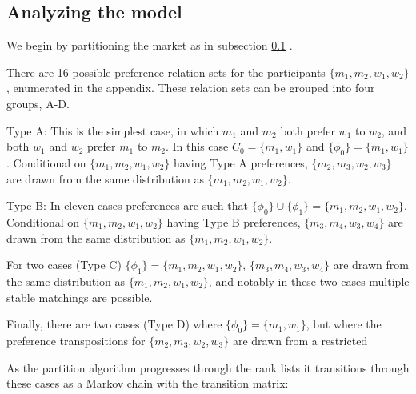 \documentclass[WP]{AEA}
\begin{document}
\subsection{Analyzing the model} \label{subsect:partition}

We begin by partitioning the market as in subsection \ref{subsect:partition} . 

There are 16 possible preference relation sets for the participants $\{m_1,m_2,w_1,w_2\}$, enumerated in the appendix. These relation sets can be grouped into four groups, A-D.

Type A: This is the simplest case, in which $m_1$ and $m_2$ both prefer $w_1$ to $w_2$, and both $w_1$ and $w_2$ prefer $m_1$ to $m_2$.  In this case $C_0 =\{m_1,w_1\}$ and $\{\phi_0\}=\{m_1,w_1\}$. 
Conditional on $\{m_1,m_2,w_1,w_2\}$ having Type A preferences, $\{m_2,m_3,w_2,w_3\}$ are drawn from the same distribution as $\{m_1,m_2,w_1,w_2\}$.  

Type B: In eleven cases preferences are such that $ \{\phi_0\} \cup \{\phi_1\}=\{m_1,m_2,w_1,w_2\} $.
Conditional on $\{m_1,m_2,w_1,w_2\}$ having Type B preferences, $\{m_3,m_4,w_3,w_4\}$ are drawn from the same distribution as $\{m_1,m_2,w_1,w_2\}$.  

 For two cases (Type C)  $\{\phi_1\}=\{m_1,m_2,w_1,w_2\}$, $\{m_3,m_4,w_3,w_4\}$ are drawn from the same distribution as $\{m_1,m_2,w_1,w_2\}$, and notably in these two cases  multiple stable matchings are possible.

Finally, there are two cases (Type D) where $\{\phi_0\}=\{m_1,w_1\}$, but where the preference transpositions for  $\{m_2,m_3,w_2,w_3\}$ are drawn from a restricted 

As the partition algorithm progresses through the rank lists it transitions through these cases as a Markov chain with the transition matrix:

\end{document}
